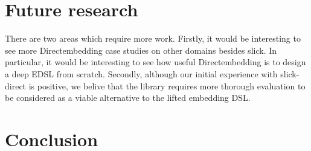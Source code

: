 \section{Future research} %
\label{sec:Future_research}
There are two areas which require more work.
Firstly, it would be interesting to see more Directembedding case studies on other domains besides slick.
In particular, it would be interesting to see how useful Directembedding is to design a deep EDSL from scratch.
Secondly, although our initial experience with slick-direct is positive, we belive that the library requires more thorough evaluation to be considered as a viable alternative to the lifted embedding DSL.

\section{Conclusion} %
\label{sec:Conclusion}


